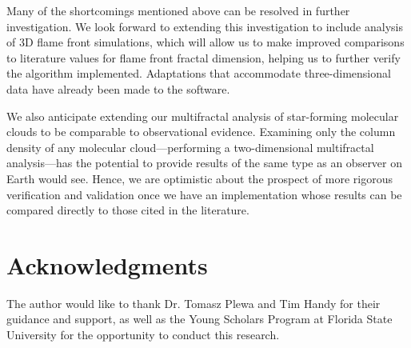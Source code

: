 \documentclass[iop]{emulateapj}
\begin{document}
Many of the shortcomings mentioned above can be resolved in further investigation. We look forward to extending this investigation to include analysis of 3D flame front simulations, which will allow us to make improved comparisons to literature values for flame front fractal dimension, helping us to further verify the algorithm implemented. Adaptations that accommodate three-dimensional data have already been made to the software.

We also anticipate extending our multifractal analysis of star-forming molecular clouds to be comparable to observational evidence. Examining only the column density of any molecular cloud---performing a two-dimensional multifractal analysis---has the potential to provide results of the same type as an observer on Earth would see. Hence, we are optimistic about the prospect of more rigorous verification and validation once we have an implementation whose results can be compared directly to those cited in the literature. 

\section{Acknowledgments}\label{s:ack}
The author would like to thank Dr. Tomasz Plewa and Tim Handy for their guidance and support, as well as the Young Scholars Program at Florida State University for the opportunity to conduct this research.
%
%


%
%
%
\end{document}
